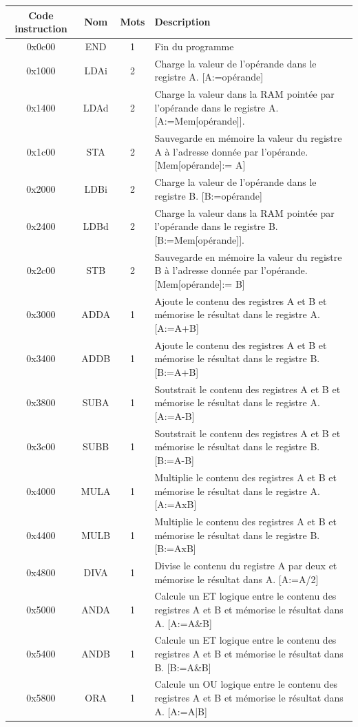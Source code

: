 \begin{table}[htbp]
\begin{tabular}{cccp{10cm}}
Code instruction & Nom & Mots & Description \\
\hline
0x0c00 & END & 1 & Fin du programme\\
0x1000 & LDAi & 2 & Charge la valeur de l'opérande dans le registre A. [A:=opérande]\\
0x1400 & LDAd & 2 & Charge la valeur dans la RAM pointée par l'opérande dans le registre A. [A:=Mem[opérande]].\\
0x1c00 & STA & 2 & Sauvegarde en mémoire la valeur du registre A à l'adresse donnée par l'opérande. [Mem[opérande]:= A]\\
0x2000 & LDBi & 2 & Charge la valeur de l'opérande dans le registre B. [B:=opérande]\\
0x2400 & LDBd & 2 & Charge la valeur dans la RAM pointée par l'opérande dans le registre B. [B:=Mem[opérande]].\\
0x2c00 & STB & 2 & Sauvegarde en mémoire la valeur du registre B à l'adresse donnée par l'opérande. [Mem[opérande]:= B]\\
0x3000 & ADDA &	1 &Ajoute le contenu des registres A et B et mémorise le résultat dans le registre A. [A:=A+B]\\
0x3400 & ADDB &1 &Ajoute le contenu des registres A et B et mémorise le résultat dans le registre B. [B:=A+B]\\
0x3800 & SUBA & 1 &Soutstrait le contenu des registres A et B et mémorise le résultat dans le registre A. [A:=A-B]\\
0x3c00&	SUBB &1 &Soutstrait le contenu des registres A et B et mémorise le résultat dans le registre B. [B:=A-B]\\
0x4000& MULA &1 &Multiplie le contenu des registres A et B et mémorise le résultat dans le registre A. [A:=AxB] \\
0x4400&	MULB &1 &Multiplie le contenu des registres A et B et mémorise le résultat dans le registre B. [B:=AxB]\\
0x4800& DIVA &1 &Divise le contenu du registre A par deux et mémorise le résultat dans A. [A:=A/2]\\
0x5000&	ANDA &1 & Calcule un ET logique entre le contenu des registres A et B et mémorise le résultat dans A. [A:=A\&B]\\
0x5400&	ANDB &1 & Calcule un ET logique entre le contenu des registres A et B et mémorise le résultat dans B. [B:=A\&B]\\
0x5800&	ORA  &1 & Calcule un OU logique entre le contenu des registres A et B et mémorise le résultat dans A. [A:=A|B]\\

\end{tabular}
\end{table}
